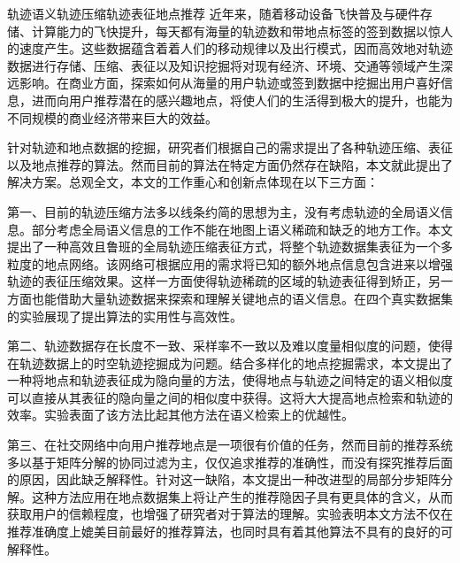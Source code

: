 
\begin{Cabstract}{轨迹语义}{轨迹压缩}{轨迹表征}{地点推荐}{}
近年来，随着移动设备飞快普及与硬件存储、计算能力的飞快提升，每天都有海量的轨迹数和带地点标签的签到数据以惊人的速度产生。这些数据蕴含着着人们的移动规律以及出行模式，因而高效地对轨迹数据进行存储、压缩、表征以及知识挖掘将对现有经济、环境、交通等领域产生深远影响。在商业方面，探索如何从海量的用户轨迹或签到数据中挖掘出用户喜好信息，进而向用户推荐潜在的感兴趣地点，将使人们的生活得到极大的提升，也能为不同规模的商业经济带来巨大的效益。

针对轨迹和地点数据的挖掘，研究者们根据自己的需求提出了各种轨迹压缩、表征以及地点推荐的算法。然而目前的算法在特定方面仍然存在缺陷，本文就此提出了解决方案。总观全文，本文的工作重心和创新点体现在以下三方面：

第一、目前的轨迹压缩方法多以线条约简的思想为主，没有考虑轨迹的全局语义信息。部分考虑全局语义信息的工作不能在地图上语义稀疏和缺乏的地方工作。本文提出了一种高效且鲁班的全局轨迹压缩表征方式，将整个轨迹数据集表征为一个多粒度的地点网络。该网络可根据应用的需求将已知的额外地点信息包含进来以增强轨迹的表征压缩效果。这样一方面使得轨迹稀疏的区域的轨迹表征得到矫正，另一方面也能借助大量轨迹数据来探索和理解关键地点的语义信息。在四个真实数据集的实验展现了提出算法的实用性与高效性。

第二、轨迹数据存在长度不一致、采样率不一致以及难以度量相似度的问题，使得在轨迹数据上的时空轨迹挖掘成为问题。结合多样化的地点挖掘需求，本文提出了一种将地点和轨迹表征成为隐向量的方法，使得地点与轨迹之间特定的语义相似度可以直接从其表征的隐向量之间的相似度中获得。这将大大提高地点检索和轨迹的效率。实验表面了该方法比起其他方法在语义检索上的优越性。

第三、在社交网络中向用户推荐地点是一项很有价值的任务，然而目前的推荐系统多以基于矩阵分解的协同过滤为主，仅仅追求推荐的准确性，而没有探究推荐后面的原因，因此缺乏解释性。针对这一缺陷，本文提出一种改进型的局部分步矩阵分解。这种方法应用在地点数据集上将让产生的推荐隐因子具有更具体的含义，从而获取用户的信赖程度，也增强了研究者对于算法的理解。实验表明本文方法不仅在推荐准确度上媲美目前最好的推荐算法，也同时具有着其他算法不具有的良好的可解释性。
\end{Cabstract}

